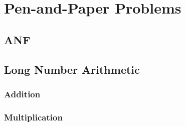 \documentclass[11pt, a4paper]{article}
\begin{document}
\section{Pen-and-Paper Problems}\label{sec:penandpaperproblems}

\subsection{ANF}\label{subsec:anf}

\subsection{Long Number Arithmetic}\label{subsec:longnumberarithmetic}

\subsubsection{Addition}\label{subsubsec:addition}

\subsubsection{Multiplication}\label{subsubsec:multiplication}
\end{document}
